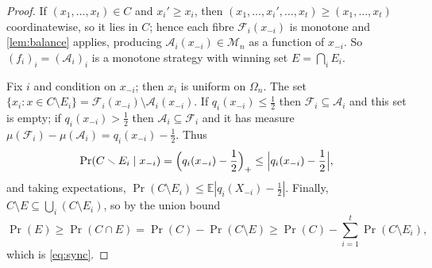 \documentclass[11pt,a4paper]{article}
\theoremstyle{plain}
\theoremstyle{definition}
\theoremstyle{remark}
\newcommand{\E}{\mathbb E}
\newcommand{\Prob}{\Pr}
\newcommand{\cA}{\mathcal A}
\newcommand{\cF}{\mathcal F}
\newcommand{\cM}{\mathcal M}
\newcommand{\Om}{\Omega}
\begin{document}
\label{pf:sync}
\lemsync*
\begin{proof}
If $(x_1,\dots,x_t)\in C$ and $x_i'\ge x_i$, then $(x_1,\dots,x_i',\dots,x_t)\ge(x_1,\dots,x_t)$ coordinatewise, so it lies in $C$; hence each fibre $\cF_i(x_{-i})$ is monotone and \cref{lem:balance} applies, producing $\cA_i(x_{-i})\in\cM_n$ as a function of $x_{-i}$. So $(f_i)_i=(\cA_i)_i$ is a monotone strategy with winning set $E=\bigcap_iE_i$.

Fix $i$ and condition on $x_{-i}$; then $x_i$ is uniform on $\Om_n$. The set $\{x_i:x\in C\setminus E_i\}=\cF_i(x_{-i})\setminus\cA_i(x_{-i})$. If $q_i(x_{-i})\le\frac12$ then $\cF_i\subseteq\cA_i$ and this set is empty; if $q_i(x_{-i})>\frac12$ then $\cA_i\subseteq\cF_i$ and it has measure $\mu(\cF_i)-\mu(\cA_i)=q_i(x_{-i})-\frac12$. Thus
\[
 \Prob(C\setminus E_i\mid x_{-i})=\Bigl(q_i(x_{-i})-\frac12\Bigr)_+\le\Bigl|q_i(x_{-i})-\frac12\Bigr|,
\]
and taking expectations, $\Prob(C\setminus E_i)\le\E|q_i(X_{-i})-\frac12|$. Finally, $C\setminus E\subseteq\bigcup_i(C\setminus E_i)$, so by the union bound
\[
 \Prob(E)\ge\Prob(C\cap E)=\Prob(C)-\Prob(C\setminus E)\ge\Prob(C)-\sum_{i=1}^t\Prob(C\setminus E_i),
\]
which is \eqref{eq:sync}.
\end{proof}
\end{document}
